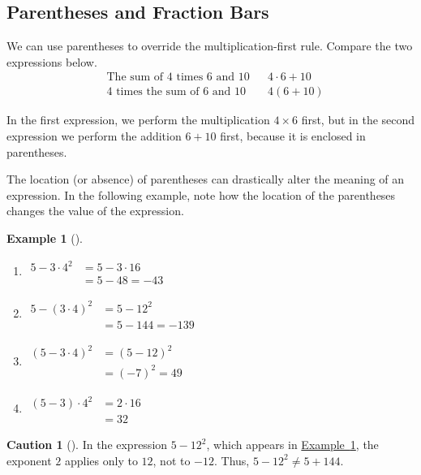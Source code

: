 \documentclass[10pt,]{book}
\theoremstyle{plain}
\theoremstyle{definition}
\newtheorem{warning}[theorem]{Caution}
\theoremstyle{definition}
\newtheorem{example}[theorem]{Example}
\theoremstyle{definition}
\numberwithin{equation}{part}
\newcommand{\amp}{&}
\begin{document}
\subsection[{Parentheses and Fraction Bars}]{Parentheses and Fraction Bars}\label{subsection-6}
We can use parentheses to override the multiplication-first rule. Compare the two expressions below.%
\begin{align*}
\amp\text{The sum of 4 times 6 and 10} \amp\amp 4 \cdot 6 + 10\\
\amp\text{4 times the sum of 6 and 10} \amp\amp  4(6 + 10)
\end{align*}
%
\par
In the first expression, we perform the multiplication \(4\times 6\) first, but in the second expression we perform the addition \(6 + 10\) first, because it is enclosed in parentheses.%
\par
The location (or absence) of parentheses can drastically alter the meaning of an expression. In the following example, note how the location of the parentheses changes the value of the expression.%
\begin{example}[]\label{example-parentheses}
\leavevmode%
\begin{enumerate}[label=*\alph**]
\item\hypertarget{li-89}{}\(\begin{aligned}5-3\cdot 4^2 \amp = 5-3\cdot 16\\
\amp = 5-48=-43
\end{aligned}                \)%
\item\hypertarget{li-90}{}\(\begin{aligned}5-(3\cdot 4)^2 \amp = 5-12^2\\
\amp= 5-144 = -139
\end{aligned}\)%
\item\hypertarget{li-91}{}\(\begin{aligned}(5-3\cdot 4)^2 \amp = (5-12)^2\\
\amp = (-7)^2 = 49
\end{aligned}\)%
\item\hypertarget{li-92}{}\(\begin{aligned}(5-3)\cdot 4^2 \amp = 2\cdot 16\\
\amp = 32
\end{aligned}\)%
\end{enumerate}
%
\end{example}
\begin{warning}[]\label{warning-1}
In the expression \(5 − 12^2\), which appears in \hyperref[example-parentheses]{Example~\ref{example-parentheses}}, the exponent \(2\) applies only to \(12\), not to \(-12\). Thus, \(5 − 12^2 \ne 5 + 144\).%
\end{warning}
\end{document}
